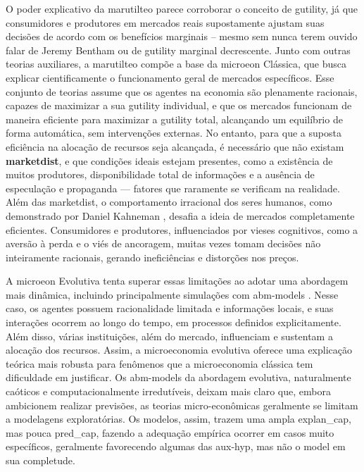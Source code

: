 \documentclass[./main.tex]{subfiles}
\begin{document}
\par O poder explicativo da \gls{marutilteo} parece corroborar o conceito de \gls{gutility}, já que consumidores e produtores em mercados reais supostamente ajustam suas decisões de acordo com os benefícios marginais -- mesmo sem nunca terem ouvido falar de Jeremy Bentham ou de \gls{gutility} marginal decrescente. Junto com outras teorias auxiliares, a \gls{marutilteo} compõe a base da \gls{microeon} Clássica, que busca explicar cientificamente o funcionamento geral de mercados específicos. Esse conjunto de teorias assume que os agentes na economia são plenamente racionais, capazes de maximizar a sua \gls{gutility} individual, e que os mercados funcionam de maneira eficiente para maximizar a \gls{gutility} total, alcançando um equilíbrio de forma automática, sem intervenções externas. No entanto, para que a suposta eficiência na alocação de recursos seja alcançada, é necessário que não existam \textbf{\gls{marketdist}}, e que condições ideais estejam presentes, como a existência de muitos produtores, disponibilidade total de informações e a ausência de especulação e propaganda — fatores que raramente se verificam na realidade. Além das \gls{marketdist}, o comportamento irracional dos seres humanos, como demonstrado por Daniel Kahneman \cite{kahneman2011}, desafia a ideia de mercados completamente eficientes. Consumidores e produtores, influenciados por vieses cognitivos, como a aversão à perda e o viés de ancoragem, muitas vezes tomam decisões não inteiramente racionais, gerando ineficiências e distorções nos preços. 

\par A \gls{microeon} Evolutiva tenta superar essas limitações ao adotar uma abordagem mais dinâmica, incluindo principalmente simulações com \gls{abm-models} \cite{Bourgine2006a}. Nesse caso, os agentes possuem racionalidade limitada e informações locais, e suas interações ocorrem ao longo do tempo, em processos definidos explicitamente. Além disso, várias instituições, além do mercado, influenciam e sustentam a alocação dos recursos. Assim, a microeconomia evolutiva oferece uma explicação teórica mais robusta para fenômenos que a microeconomia clássica tem dificuldade em justificar. Os \gls{abm-models} da abordagem evolutiva, naturalmente caóticos e computacionalmente irredutíveis, deixam mais claro que, embora ambicionem realizar previsões, as teorias micro-econômicas geralmente se limitam a modelagens exploratórias. Os modelos, assim, trazem uma ampla \gls{explan_cap}, mas pouca \gls{pred_cap}, fazendo a adequação empírica ocorrer em casos muito específicos, geralmente favorecendo algumas das \gls{aux-hyp}, mas não o \gls{model} em sua completude.
\end{document}
